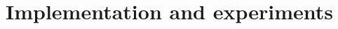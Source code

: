 \section{Implementation and experiments}
    
    \pagebreak
    
    \pagebreak
    
    \pagebreak
    
    \pagebreak
    
    \pagebreak
    